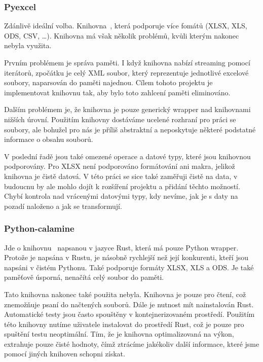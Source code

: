 \subsubsection{Pyexcel}

Zdánlivě ideální volba. Knihovna~\cite{Pyexcel}, která podporuje více fomátů (XLSX, XLS, ODS, CSV, \dots). Knihovna má však několik problémů, kvůli kterým nakonec nebyla využita.

Prvním problémem je správa paměti. I když knihovna nabízí streaming pomocí iterátorů, zpočátku je celý XML soubor, který reprezentuje jednotlivé excelové soubory, naparsován do paměti najednou. Cílem tohoto projektu je implementovat knihovnu tak, aby bylo toto zahlcení paměti eliminováno.

Dalším problémem je, že knihovna je pouze generický wrapper nad knihovnami nižších úrovní. Použitím knihovny dostáváme ucelené rozhraní pro práci se soubory, ale bohužel pro nás je příliš abstraktní a neposkytuje některé podstatné informace o obsahu souborů.

V poslední řadě jsou také omezené operace a datové typy, které jsou knihovnou podporovány. Pro XLSX není podporováno formátování ani makra, jelikož knihovna je čistě datová. V této práci se sice také zaměřuji čistě na data, v budoucnu by ale mohlo dojít k rozšíření projektu a přidání těchto možností. Chybí kontrola nad vrácenými datovými typy, kdy nevíme, jak je s daty na pozadí naloženo a jak se transformují.

\subsubsection{Python-calamine} 
\label{sec:calamine}

Jde o knihovnu~\cite{Python-calamine} napsanou v jazyce Rust, která má pouze Python wrapper. Protože je napsána v Rustu, je násobně rychlejší než její konkurenti, kteří jsou napsáni v čistém Pythonu. Také podporuje formáty XLSX, XLS a ODS. Je také paměťově úsporná, nenačítá celý soubor do paměti.

Tato knihovna nakonec také použita nebyla. Knihovna je pouze pro čtení, což znemožňuje psaní do načtených souborů. Dále je nutnost mít nainstalován Rust. Automatické testy jsou často spouštěny v kontejnerizovaném prostředí. Použitím této knihovny nutíme uživatele instalovat do prostředí Rust, což je pouze pro spuštění testu neoptimální. Tím, že je knihovna optimalizovaná na výkon, extrahuje pouze čisté hodnoty, čímž ztrácíme jakékoliv další informace, které jsme pomocí jiných knihoven schopni získat.

